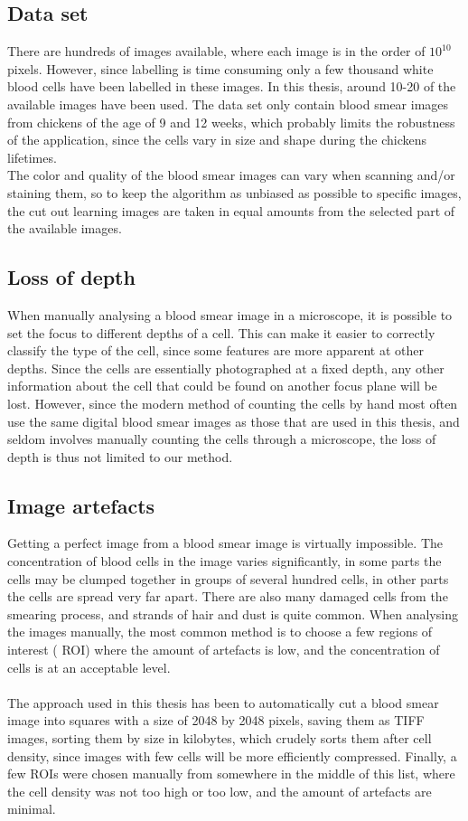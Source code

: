\subsection{Data set}
There are hundreds of images available, where each image is in the order of $10^10$ pixels. However, since labelling is time consuming only a few thousand white blood cells have been labelled in these images. In this thesis, around 10-20 of the available images have been used. The data set only contain blood smear images from chickens of the age of 9 and 12 weeks, which probably limits the robustness of the application, since the cells vary in size and shape during the chickens lifetimes.\\
The color and quality of the blood smear images can vary when scanning and/or staining them, so to keep the algorithm as unbiased as possible to specific images, the cut out learning images are taken in equal amounts from the selected part of the available images.

\subsection{Loss of depth}
When manually analysing a blood smear image in a microscope, it is possible to set the focus to different depths of a cell. This can make it easier to correctly classify the type of the cell, since some features are more apparent at other depths. Since the cells are essentially photographed at a fixed depth, any other information about the cell that could be found on another focus plane will be lost.
However, since the modern method of counting the cells by hand most often use the same digital blood smear images as those that are used in this thesis, and seldom involves manually counting the cells through a microscope, the loss of depth is thus not limited to our method.

\subsection{Image artefacts}
Getting a perfect image from a blood smear image is virtually impossible. The concentration of blood cells in the image varies significantly, in some parts the cells may be clumped together in groups of several hundred cells, in other parts the cells are spread very far apart. There are also many damaged cells from the smearing process, and strands of hair and dust is quite common. When analysing the images manually, the most common method is to choose a few regions of interest ( ROI) where the amount of artefacts is low, and the concentration of cells is at an acceptable level.\\\\
The approach used in this thesis has been to automatically cut a blood smear image into squares with a size of 2048 by 2048 pixels, saving them as TIFF images, sorting them by size in kilobytes, which crudely sorts them after cell density, since images with few cells will be more efficiently compressed. Finally, a few ROIs were chosen manually from somewhere in the middle of this list, where the cell density was not too high or too low, and the amount of artefacts are minimal.

